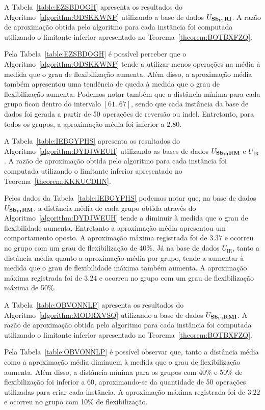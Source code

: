 A Tabela~\ref{table:EZSBDOGH} apresenta os resultados do Algoritmo~\ref{algorithm:ODSKKWNP} utilizando a base de dados $U_{\textbf{Sb\textsubscript{FI}RI}}{}$. A razão de aproximação obtida pelo algoritmo para cada instância foi computada utilizando o limitante inferior apresentado no Teorema~\ref{theorem:BOTBXFZQ}.



Pela Tabela~\ref{table:EZSBDOGH} é possível perceber que o Algoritmo~\ref{algorithm:ODSKKWNP} tende a utilizar menos operações na média à medida que o grau de flexibilização aumenta. Além disso, a aproximação média também apresentou uma tendência de queda à medida que o grau de flexibilização aumenta. Podemos notar também que a distância mínima para cada grupo ficou dentro do intervalo $[61..67]$, sendo que cada instância da base de dados foi gerada a partir de 50 operações de reversão ou indel. Entretanto, para todos os grupos, a aproximação média foi inferior a $2.80$.

A Tabela~\ref{table:IEBGYPHS} apresenta os resultados do Algoritmo~\ref{algorithm:DYDJWEUH} utilizando as bases de dados $U_{\textbf{Sb\textsubscript{FI}RM}}{}$ e $U_{\text{IR}}$. A razão de aproximação obtida pelo algoritmo para cada instância foi computada utilizando o limitante inferior apresentado no Teorema~\ref{theorem:KKKUCDHN}.



Pelos dados da Tabela~\ref{table:IEBGYPHS} podemos notar que, na base de dados $U_{\textbf{Sb\textsubscript{FI}RM}}{}$, a distância média de cada grupo obtida através do Algoritmo~\ref{algorithm:DYDJWEUH} tende a diminuir à medida que o grau de flexibilidade aumenta. Entretanto a aproximação média apresentou um comportamento oposto. A aproximação máxima registrada foi de $3.37$ e ocorreu no grupo com um grau de flexibilização de 40\%. Já na base de dados $U_{\text{IR}}$, tanto a distância média quanto a aproximação média por grupo, tende a aumentar à medida que o grau de flexibilidade máxima também aumenta. A aproximação máxima registrada foi de $3.24$ e ocorreu no grupo com um grau de flexibilização máxima de 50\%.

A Tabela~\ref{table:OBVONNLP} apresenta os resultados do Algoritmo~\ref{algorithm:MODRXVSQ} utilizando a base de dados $U_{\textbf{Sb\textsubscript{FI}RMI}}{}$. A razão de aproximação obtida pelo algoritmo para cada instância foi computada utilizando o limitante inferior apresentado no Teorema~\ref{theorem:BOTBXFZQ}.



Pela Tabela~\ref{table:OBVONNLP} é possível observar que, tanto a distância média como a aproximação média diminuem à medida que o grau de flexibilização aumenta. Além disso, a distância mínima para os grupos com 40\% e 50\% de flexibilização foi inferior a 60, aproximando-se da quantidade de 50 operações utilizadas para criar cada instância. A aproximação máxima registrada foi de $3.22$ e ocorreu no grupo com 10\% de flexibilização.

